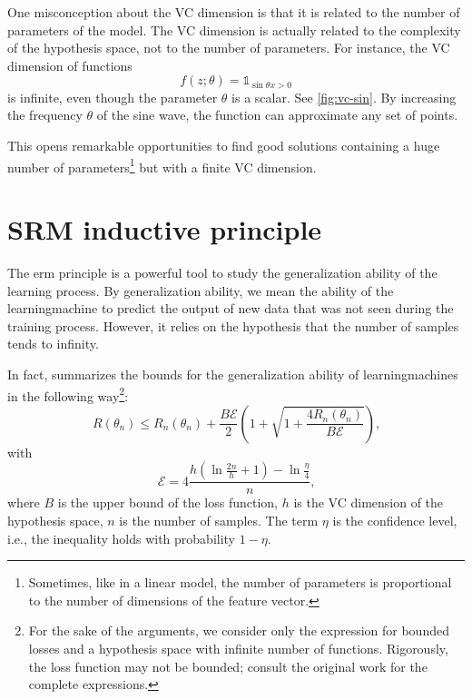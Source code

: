 One misconception about the VC dimension is that it is related to the number of parameters
of the model.  The VC dimension is actually related to the complexity of the hypothesis space, not
to the number of parameters.  For instance, the VC dimension of functions
\[
  f(z; \theta) = \mathbb{1}_{\sin \theta x > 0}
\]
is infinite, even though the parameter $\theta$ is a scalar.  See \cref{fig:vc-sin}.
By increasing the frequency $\theta$ of the sine wave, the function can approximate any set
of points.

This opens remarkable opportunities to find good solutions containing a huge number of
parameters\footnote{Sometimes, like in a linear model, the number of parameters is
proportional to the number of dimensions of the feature vector.} but with a finite VC
dimension.  %

\section{SRM inductive principle}

The \gls{erm} principle is a powerful tool to study the generalization ability of the
learning process.  By generalization ability, we mean the ability of the \gls{learningmachine}
to predict the output of new data that was not seen during the training process.  However,
it relies on the hypothesis that the number of samples tends to infinity.

In fact, \textcite{Vapnik1999b} summarizes the bounds for the
generalization ability of \glspl{learningmachine} in the following way\footnote{ For the sake of
the arguments, we consider only the expression for bounded losses and a hypothesis space
with infinite number of functions.  Rigorously, the \gls{loss} function may not be bounded;
consult the original work for the complete expressions.}:
\begin{equation}
  \label{eq:generalization-bound}
  R(\theta_n) \leq R_n(\theta_n) + \frac{B \mathcal{E}}{2} \left(
    1 + \sqrt{1 + \frac{4 R_n(\theta_n)}{B \mathcal{E}}}
  \right)\text{,}
\end{equation}
with
\[
  \mathcal{E} = 4 \frac{
    h \left( \ln \frac{2 n}{h} + 1 \right) - \ln \frac{\eta}{4}
  }{n}\text{,}
\]
where $B$ is the upper bound of the \gls{loss} function, $h$ is the VC dimension of the
hypothesis space, $n$ is the number of samples.  The term $\eta$ is the confidence level,
i.e., the inequality holds with probability $1 - \eta$.

